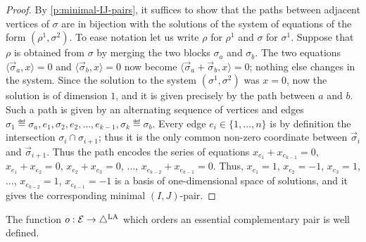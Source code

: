 \begin{proof}
    By \cref{p:minimal-IJ-pairs}, it suffices to show that the paths between adjacent vertices of $\sigma$ are in bijection with the solutions of the system of equations of the form $(\rho^1,\sigma^2)$. 
    To ease notation let us write $\rho$ for $\rho^1$ and $\sigma$ for $\sigma^1$. 
    Suppose that $\rho$ is obtained from $\sigma$ by merging the two blocks $\sigma_a$ and $\sigma_b$. 
    The two equations $\langle \vec \sigma_a, x \rangle =0$ and $\langle \vec \sigma_b, x \rangle =0$ now become $\langle \vec \sigma_a + \vec \sigma_b, x \rangle =0$; nothing else changes in the system. 
    Since the solution to the system $(\sigma^1,\sigma^2)$ was $x=0$, now the solution is of dimension $1$, and it is given precisely by the path between $a$ and $b$.
    Such a path is given by an alternating sequence of vertices and edges $\sigma_1 \eqdef \sigma_a, e_1, \sigma_2, e_2, \ldots, e_{k-1}, \sigma_k \eqdef \sigma_b$. 
    Every edge $e_i \in \{1,\ldots, n\}$ is by definition the intersection $\sigma_{i} \cap \sigma_{i+1}$; thus it is the only common non-zero coordinate between $\vec \sigma_{i}$ and $\vec \sigma_{i+1}$.
    Thus the path encodes the series of equations $x_{e_1}+x_{e_{k-1}}=0$, $x_{e_1}+x_{e_2}=0$, $x_{e_2}+x_{e_3}=0$, $\ldots$, $x_{e_{k-2}}+x_{e_{k-1}}=0$. 
    Thus, $x_{e_1}=1$, $x_{e_2}=-1$, $x_{e_3}=1$, $\ldots$, $x_{e_{k-2}}=1$, $x_{e_{k-1}}=-1$ is a basis of one-dimensional space of solutions, and it gives the corresponding minimal $(I,J)$-pair. 
\end{proof}

\begin{lemma} 
\label{l:o-well-defined}
The function $o:\mathcal{E} \to \triangle^{\mathrm{LA}}$ which orders an essential complementary pair is well defined.
\end{lemma}


